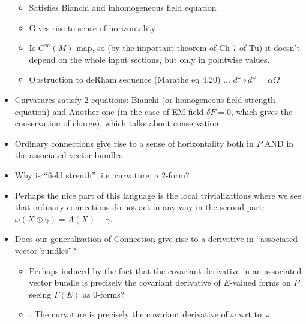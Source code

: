 \begin{itemize}
\begin{itemize}
        \item Satisfies Bianchi and inhomogeneous field equation
        
        \item Gives rise to sense of horizontality
        
        \item Is $C^\infty(M)$ map, so (by the important theorem of Ch 7 of Tu) it doesn't depend on the whole input sections, but only in pointwise values.
        
        \item Obstruction to deRham sequence (Marathe eq 4.20) ... $d^\omega \circ d^\omega = \alpha \Omega$

    \end{itemize}
    
    \item Curvatures satisfy $2$ equations: Bianchi (or homogeneous field strength equation) and Another one (in the case of EM field $\delta F = 0$, which gives the conservation of charge), which talks about conservation. \label{BianchiandInhomogeneous}
    
    \item Ordinary connections give rise to a sense of horizontality both in $P$ AND in the associated vector bundles. \label{ordinaryHorizontality}
    
    \item Why is ``field strenth'', i.e. curvature, a $2$-form?
    
    
    
    \item Perhaps the nice part of this language is the local trivializations where we see that ordinary connections do not act in any way in the second part: $\omega(X \oplus \gamma) = A(X) - \gamma$.
    
    
    
    \item Does our generalization of Connection give rise to a  derivative in ``associated vector bundles''? \label{trulyCovariant}
    \begin{itemize}
        \item Perhaps induced by the fact that the covariant derivative in an associated vector bundle is precisely the covariant derivative of $E$-valued forms on $P$ seeing $\Gamma(E)$ as $0$-forms?
        
        \item {}. The curvature is precisely the covariant derivative of $\omega$ wrt to $\omega$
        

\end{itemize}
\end{itemize}
